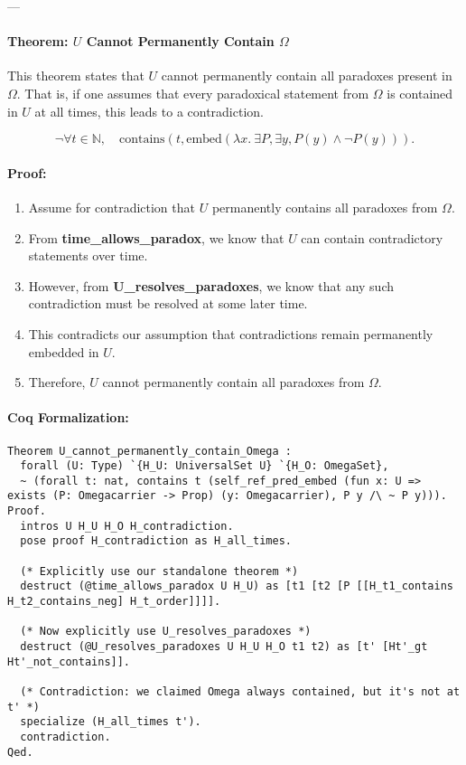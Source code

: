 \documentclass[12pt]{article}
\begin{document}
---

\paragraph{Theorem: \( U \) Cannot Permanently Contain \( \Omega \)}
This theorem states that \( U \) cannot permanently contain all paradoxes present in \( \Omega \). That is, if one assumes that every paradoxical statement from \( \Omega \) is contained in \( U \) at all times, this leads to a contradiction.

\begin{equation}
    \neg \forall t \in \mathbb{N}, \quad
    \text{contains}(t, \text{embed}(\lambda x.\ \exists P, \exists y, P(y) \wedge \neg P(y))).
\end{equation}

\paragraph{Proof:}
\begin{enumerate}
    \item Assume for contradiction that \( U \) permanently contains all paradoxes from \( \Omega \).
    \item From \textbf{time\_allows\_paradox}, we know that \( U \) can contain contradictory statements over time.
    \item However, from \textbf{U\_resolves\_paradoxes}, we know that any such contradiction must be resolved at some later time.
    \item This contradicts our assumption that contradictions remain permanently embedded in \( U \).
    \item Therefore, \( U \) cannot permanently contain all paradoxes from \( \Omega \).
\end{enumerate}

\paragraph{Coq Formalization:}
\begin{lstlisting}[language=Coq]
Theorem U_cannot_permanently_contain_Omega :
  forall (U: Type) `{H_U: UniversalSet U} `{H_O: OmegaSet},
  ~ (forall t: nat, contains t (self_ref_pred_embed (fun x: U => exists (P: Omegacarrier -> Prop) (y: Omegacarrier), P y /\ ~ P y))).
Proof.
  intros U H_U H_O H_contradiction.
  pose proof H_contradiction as H_all_times.

  (* Explicitly use our standalone theorem *)
  destruct (@time_allows_paradox U H_U) as [t1 [t2 [P [[H_t1_contains H_t2_contains_neg] H_t_order]]]].

  (* Now explicitly use U_resolves_paradoxes *)
  destruct (@U_resolves_paradoxes U H_U H_O t1 t2) as [t' [Ht'_gt Ht'_not_contains]].

  (* Contradiction: we claimed Omega always contained, but it's not at t' *)
  specialize (H_all_times t').
  contradiction.
Qed.
\end{lstlisting}
\end{document}
